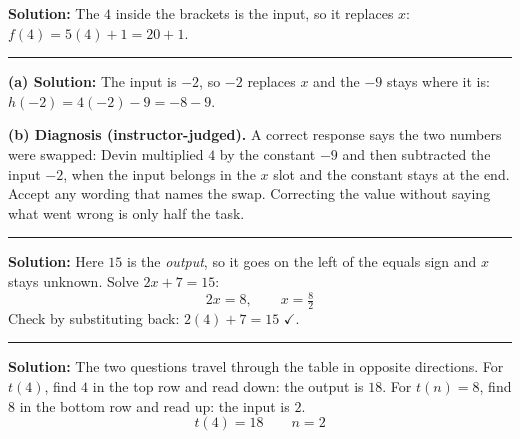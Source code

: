 \documentclass[12pt]{article}
\begin{document}



\textbf{Solution:} \quad The $4$ inside the brackets is the input, so it replaces $x$:
$f(4) = 5(4) + 1 = 20 + 1$. 

\vspace{0.25cm}

\noindent\rule{\linewidth}{0.2pt}


\textbf{(a) Solution:} \quad The input is $-2$, so $-2$ replaces $x$ and the $-9$ stays where it
is: $h(-2) = 4(-2) - 9 = -8 - 9$. 

\textbf{(b) Diagnosis (instructor-judged).} A correct response says the two numbers were
swapped: Devin multiplied $4$ by the constant $-9$ and then subtracted the input $-2$, when the
input belongs in the $x$ slot and the constant stays at the end. Accept any wording that names
the swap. Correcting the value without saying what went wrong is only half the task.

\vspace{0.25cm}

\noindent\rule{\linewidth}{0.2pt}


\textbf{Solution:} \quad Here $15$ is the \textit{output}, so it goes on the left of the equals
sign and $x$ stays unknown. Solve $2x + 7 = 15$:
\[ 2x = 8, \qquad x = \tfrac{8}{2} \]
Check by substituting back: $2(4) + 7 = 15$ $\checkmark$. 

\vspace{0.25cm}

\noindent\rule{\linewidth}{0.2pt}


\textbf{Solution:} \quad The two questions travel through the table in opposite directions.
For $t(4)$, find $4$ in the top row and read down: the output is $18$. For $t(n) = 8$, find $8$
in the bottom row and read up: the input is $2$.
\[ \boxed{t(4) = 18 \qquad n = 2} \]

\vspace{0.25cm}
\end{document}
